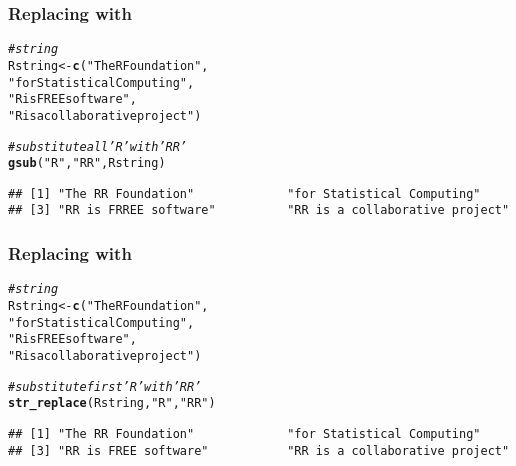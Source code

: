 \documentclass[12pt]{beamer}\usepackage[]{graphicx}\usepackage[]{color}
\makeatletter
\newcommand{\hlstr}[1]{\textcolor[rgb]{0.192,0.494,0.8}{#1}}%
\newcommand{\hlcom}[1]{\textcolor[rgb]{0.678,0.584,0.686}{\textit{#1}}}%
\newcommand{\hlstd}[1]{\textcolor[rgb]{0.345,0.345,0.345}{#1}}%
\newcommand{\hlkwb}[1]{\textcolor[rgb]{0.69,0.353,0.396}{#1}}%
\newcommand{\hlkwd}[1]{\textcolor[rgb]{0.737,0.353,0.396}{\textbf{#1}}}%
\newenvironment{kframe}{%
 \def\at@end@of@kframe{}%
 \ifinner\ifhmode%
  \def\at@end@of@kframe{\end{minipage}}%
  \begin{minipage}{\columnwidth}%
 \fi\fi%
 \def\FrameCommand##1{\hskip\@totalleftmargin \hskip-\fboxsep
 \colorbox{shadecolor}{##1}\hskip-\fboxsep
     \hskip-\linewidth \hskip-\@totalleftmargin \hskip\columnwidth}%
 \MakeFramed {\advance\hsize-\width
   \@totalleftmargin\z@ \linewidth\hsize
   \@setminipage}}%
 {\par\unskip\endMakeFramed%
 \at@end@of@kframe}
\newenvironment{knitrout}{}{} %
\makeatother
\begin{document}
\begin{frame}[fragile]
\frametitle{Replacing with }

\begin{knitrout}\scriptsize
{}\color{fgcolor}\begin{kframe}
\begin{alltt}
\hlcom{# string}
\hlstd{Rstring} \hlkwb{<-} \hlkwd{c}\hlstd{(}\hlstr{"The R Foundation"}\hlstd{,}
            \hlstr{"for Statistical Computing"}\hlstd{,}
            \hlstr{"R is FREE software"}\hlstd{,}
            \hlstr{"R is a collaborative project"}\hlstd{)}

\hlcom{# substitute all 'R' with 'RR'}
\hlkwd{gsub}\hlstd{(}\hlstr{"R"}\hlstd{,} \hlstr{"RR"}\hlstd{, Rstring)}
\end{alltt}
\begin{verbatim}
## [1] "The RR Foundation"             "for Statistical Computing"    
## [3] "RR is FRREE software"          "RR is a collaborative project"
\end{verbatim}
\end{kframe}
\end{knitrout}

\end{frame}


\begin{frame}[fragile]
\frametitle{Replacing with }

\begin{knitrout}\scriptsize
{}\color{fgcolor}\begin{kframe}
\begin{alltt}
\hlcom{# string}
\hlstd{Rstring} \hlkwb{<-} \hlkwd{c}\hlstd{(}\hlstr{"The R Foundation"}\hlstd{,}
            \hlstr{"for Statistical Computing"}\hlstd{,}
            \hlstr{"R is FREE software"}\hlstd{,}
            \hlstr{"R is a collaborative project"}\hlstd{)}

\hlcom{# substitute first 'R' with 'RR'}
\hlkwd{str_replace}\hlstd{(Rstring,} \hlstr{"R"}\hlstd{,} \hlstr{"RR"}\hlstd{)}
\end{alltt}
\begin{verbatim}
## [1] "The RR Foundation"             "for Statistical Computing"    
## [3] "RR is FREE software"           "RR is a collaborative project"
\end{verbatim}
\end{kframe}
\end{knitrout}

\end{frame}
\end{document}
